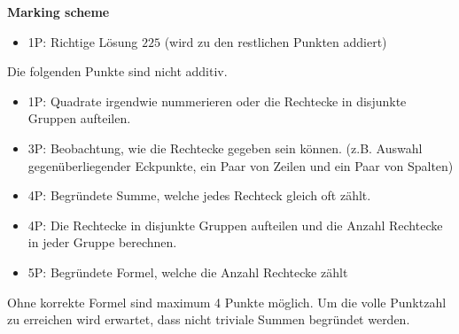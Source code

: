 {\textbf{Marking scheme}%
\begin{itemize}
    \item 1P: Richtige Lösung $225$ (wird zu den restlichen Punkten addiert)
\end{itemize}
Die folgenden Punkte sind nicht additiv.
\begin{itemize}
    \item 1P: Quadrate irgendwie nummerieren oder die Rechtecke in disjunkte Gruppen aufteilen.
    \item 3P: Beobachtung, wie die Rechtecke gegeben sein können. (z.B. Auswahl gegenüberliegender Eckpunkte, ein Paar von Zeilen und ein Paar von Spalten)
    \item 4P: Begründete Summe, welche jedes Rechteck gleich oft zählt.
    \item 4P: Die Rechtecke in disjunkte Gruppen aufteilen und die Anzahl Rechtecke in jeder Gruppe berechnen.
    \item 5P: Begründete Formel, welche die Anzahl Rechtecke zählt
\end{itemize}

Ohne korrekte Formel sind maximum 4 Punkte möglich. Um die volle Punktzahl zu erreichen wird erwartet, dass nicht triviale Summen begründet werden.
}

